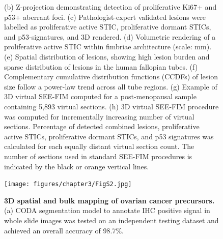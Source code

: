 \begin{refsection}
    \begin{figure}[h!]
        \ContinuedFloat
        \captionsetup{font=small}
        \caption[]{(b) Z-projection demonstrating detection of proliferative Ki67+ and p53+ aberrant foci. (c) Pathologist-expert validated lesions were labelled as proliferative active STIC, proliferative dormant STICs, and p53-signatures, and 3D rendered. (d) Volumetric rendering of a proliferative active STIC within fimbriae architecture (scale: mm). (e) Spatial distribution of lesions, showing high lesion burden and sparse distribution of lesions in the human fallopian tubes. (f) Complementary cumulative distribution functions (CCDFs) of lesion size follow a power-law trend across all tube regions. (g) Example of 3D virtual SEE-FIM computed for a post-menopausal sample containing 5,893 virtual sections. (h) 3D virtual SEE-FIM procedure was computed for incrementally increasing number of virtual sections. Percentage of detected combined lesions, proliferative active STICs, proliferative dormant STICs, and p53 signatures was calculated for each equally distant virtual section count. The number of sections used in standard SEE-FIM procedures is indicated by the black or orange vertical lines.}
    \end{figure}

    \begin{figure}[p]
        \begin{center}
            \texttt{[image: figures/chapter3/FigS2.jpg]}
            \captionsetup{font=small}
            \caption{ \textbf{3D spatial and bulk mapping of ovarian cancer precursors.} (a) CODA segmentation model to annotate IHC positive signal in whole slide images was tested on an independent testing dataset and achieved an overall accuracy of 98.7\%.}
            \label{chapter3_figS2}
        \end{center}
    \end{figure}
    

\end{refsection}
